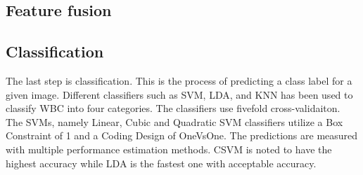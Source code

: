 \subsection{Feature fusion}

\subsection{Classification}

The last step is classification. This is the process of predicting a class label for a given image. Different classifiers such as SVM,
LDA,
and KNN has been used to classify WBC into four categories. The classifiers use fivefold cross-validaiton. The SVMs, namely Linear, Cubic and Quadratic SVM classifiers utilize a Box Constraint of 1 and a Coding Design of OneVsOne. The predictions are measured with multiple performance estimation methods. CSVM is noted to have the highest accuracy while LDA is the fastest one with acceptable accuracy.
